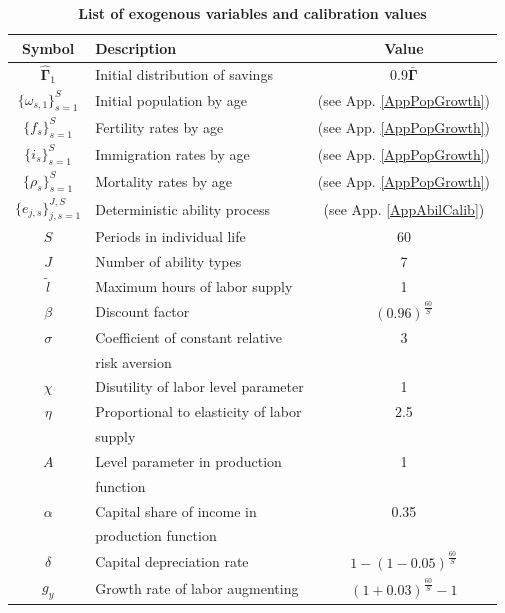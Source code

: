 \documentclass[letterpaper,12pt]{article}
\theoremstyle{definition}
\begin{document}
\begin{spacing}{1.5}
    \begin{table}[htbp] \centering \captionsetup{width=4.4in}
    \caption{\label{TabExogVars}\textbf{List of exogenous variables and calibration values}}
      \begin{threeparttable}
      \begin{tabular}{>{\small}c |>{\small}l |>{\small}c}
        \hline\hline
        Symbol & \quad\quad\quad\quad Description & Value \\
        \hline
        $\bm{\hat{\Gamma}}_1$ & Initial distribution of savings & $0.9\bm{\bar{\Gamma}}$ \\
        $\{\omega_{s,1}\}_{s=1}^S$ & Initial population by age & (see App. \ref{AppPopGrowth}) \\
        $\{f_s\}_{s=1}^S$ & Fertility rates by age & (see App. \ref{AppPopGrowth}) \\
        $\{i_s\}_{s=1}^S$ & Immigration rates by age & (see App. \ref{AppPopGrowth}) \\
        $\{\rho_s\}_{s=1}^S$ & Mortality rates by age & (see App. \ref{AppPopGrowth}) \\
        $\{e_{j,s}\}_{j,s=1}^{J,S}$ & Deterministic ability process & (see App. \ref{AppAbilCalib}) \\
        $S$ & Periods in individual life & 60 \\
        $J$ & Number of ability types & 7 \\
        $\tilde{l}$ & Maximum hours of labor supply & 1 \\
        $\beta$ & Discount factor & $(0.96)^\frac{60}{S}$ \\
        $\sigma$ & Coefficient of constant relative & 3 \\
        & \quad risk aversion & \\
        $\chi$ & Disutility of labor level parameter & 1 \\
        $\eta$ & Proportional to elasticity of labor & 2.5 \\
        & \quad supply & \\
        $A$ & Level parameter in production & 1 \\
        & \quad function & \\
        $\alpha$ & Capital share of income in & 0.35 \\
        & \quad production function & \\
        $\delta$ & Capital depreciation rate & $1-(1-0.05)^\frac{60}{S}$ \\
        $g_y$ & Growth rate of labor augmenting & $(1+0.03)^\frac{60}{S}-1$ \\

\end{tabular}
\end{threeparttable}
\end{table}
\end{spacing}
\end{document}
